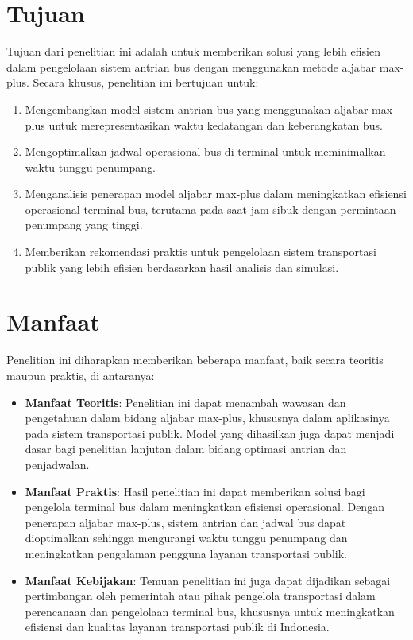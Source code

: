 \documentclass{file/TA-ITS}
\theoremstyle{definition}
\theoremstyle{definition}
\theoremstyle{plain}
\begin{document}
\section{Tujuan}
Tujuan dari penelitian ini adalah untuk memberikan solusi yang lebih efisien dalam pengelolaan sistem antrian bus dengan menggunakan metode aljabar max-plus. Secara khusus, penelitian ini bertujuan untuk:

\begin{enumerate}
    \item Mengembangkan model sistem antrian bus yang menggunakan aljabar max-plus untuk merepresentasikan waktu kedatangan dan keberangkatan bus.
    \item Mengoptimalkan jadwal operasional bus di terminal untuk meminimalkan waktu tunggu penumpang.
    \item Menganalisis penerapan model aljabar max-plus dalam meningkatkan efisiensi operasional terminal bus, terutama pada saat jam sibuk dengan permintaan penumpang yang tinggi.
    \item Memberikan rekomendasi praktis untuk pengelolaan sistem transportasi publik yang lebih efisien berdasarkan hasil analisis dan simulasi.
\end{enumerate}

\section{Manfaat}
Penelitian ini diharapkan memberikan beberapa manfaat, baik secara teoritis maupun praktis, di antaranya:

\begin{itemize}
    \item \textbf{Manfaat Teoritis}: Penelitian ini dapat menambah wawasan dan pengetahuan dalam bidang aljabar max-plus, khususnya dalam aplikasinya pada sistem transportasi publik. Model yang dihasilkan juga dapat menjadi dasar bagi penelitian lanjutan dalam bidang optimasi antrian dan penjadwalan.
    \item \textbf{Manfaat Praktis}: Hasil penelitian ini dapat memberikan solusi bagi pengelola terminal bus dalam meningkatkan efisiensi operasional. Dengan penerapan aljabar max-plus, sistem antrian dan jadwal bus dapat dioptimalkan sehingga mengurangi waktu tunggu penumpang dan meningkatkan pengalaman pengguna layanan transportasi publik.
    \item \textbf{Manfaat Kebijakan}: Temuan penelitian ini juga dapat dijadikan sebagai pertimbangan oleh pemerintah atau pihak pengelola transportasi dalam perencanaan dan pengelolaan terminal bus, khususnya untuk meningkatkan efisiensi dan kualitas layanan transportasi publik di Indonesia.
\end{itemize}
\end{document}
